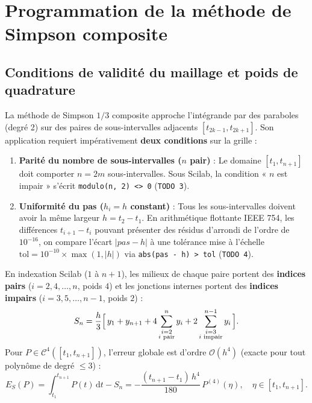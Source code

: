 \documentclass[10pt,a4paper]{article}
\begin{document}
\section{Programmation de la méthode de Simpson composite}

\subsection{Conditions de validité du maillage et poids de quadrature}
La méthode de Simpson $1/3$ composite approche l'intégrande par des paraboles (degré 2) sur des paires de sous-intervalles adjacents $[t_{2k-1}, t_{2k+1}]$. Son application requiert impérativement \textbf{deux conditions} sur la grille :
\begin{enumerate}
    \item \textbf{Parité du nombre de sous-intervalles ($n$ pair)} : Le domaine $[t_1, t_{n+1}]$ doit comporter $n = 2m$ sous-intervalles. Sous Scilab, la condition « $n$ est impair » s'écrit \texttt{modulo(n, 2) <> 0} (\texttt{TODO 3}).
    \item \textbf{Uniformité du pas ($h_i = h$ constant)} : Tous les sous-intervalles doivent avoir la même largeur $h = t_2 - t_1$. En arithmétique flottante IEEE 754, les différences $t_{i+1} - t_i$ pouvant présenter des résidus d'arrondi de l'ordre de $10^{-16}$, on compare l'écart $|pas - h|$ à une tolérance mise à l'échelle $\text{tol} = 10^{-10} \times \max(1, |h|)$ via \texttt{abs(pas - h) > tol} (\texttt{TODO 4}).
\end{enumerate}

En indexation Scilab ($1$ à $n+1$), les milieux de chaque paire portent des \textbf{indices pairs} ($i = 2, 4, \dots, n$, poids $4$) et les jonctions internes portent des \textbf{indices impairs} ($i = 3, 5, \dots, n-1$, poids $2$) :
\begin{equation}
    S_n = \frac{h}{3}\Bigl[\,y_1 + y_{n+1} + 4\sum_{\substack{i=2\\i\text{ pair}}}^{n} y_i + 2\sum_{\substack{i=3\\i\text{ impair}}}^{n-1} y_i\,\Bigr].
    \label{eq:simpson}
\end{equation}
Pour $P \in \mathcal{C}^4([t_1, t_{n+1}])$, l'erreur globale est d'ordre $\mathcal{O}(h^4)$ (exacte pour tout polynôme de degré $\le 3$) :
\begin{equation}
    E_S(P) = \int_{t_1}^{t_{n+1}} P(t)\,\mathrm{d}t - S_n = -\frac{(t_{n+1} - t_1)\,h^4}{180}\,P^{(4)}(\eta), \quad \eta \in [t_1, t_{n+1}].
    \label{eq:err_simp}
\end{equation}
\end{document}
